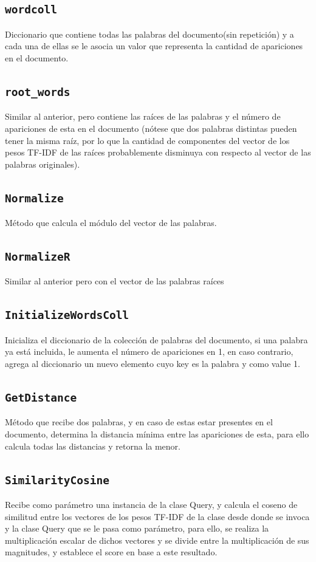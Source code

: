 \documentclass{report}
\newcommand{\csharpproperty}[1]{\textcolor{csharp-property}{\texttt{#1}}}
\begin{document}
\subsection{\csharpproperty{wordcoll}}
Diccionario que contiene todas las palabras del documento(sin repetición) y a cada una de ellas se le asocia un valor que representa la cantidad de apariciones en el documento.
\subsection{\csharpproperty{root\_{}words}}
Similar al anterior, pero contiene las raíces de las palabras y el número de apariciones de esta en el documento (nótese que dos palabras distintas pueden tener la misma raíz, por lo que la cantidad de componentes del vector de los pesos TF-IDF de las raíces probablemente disminuya con respecto al vector de las palabras originales).


\subsection{\csharpproperty{Normalize}}
Método que calcula el módulo del vector de las palabras.
\subsection{\csharpproperty{NormalizeR}}
Similar al anterior pero con el vector de las palabras raíces
\subsection{\csharpproperty{InitializeWordsColl}}
Inicializa el diccionario de la colección de palabras del documento, si una palabra ya está incluida, le aumenta el número de apariciones en 1, en caso contrario, agrega al diccionario un nuevo elemento cuyo key es la palabra y como value 1.
\subsection{\csharpproperty{GetDistance}}
Método que recibe dos palabras, y en caso de estas estar presentes en el documento, determina la distancia mínima entre las apariciones de esta, para ello calcula todas las distancias y retorna la menor.
\subsection{\csharpproperty{SimilarityCosine}}
Recibe como parámetro una instancia de la clase Query, y calcula el coseno de similitud entre los vectores de los pesos TF-IDF de la clase desde donde se invoca y la clase Query que se le pasa como parámetro, para ello, se realiza la multiplicación escalar de dichos vectores y se divide entre la multiplicación de sus magnitudes, y establece el score en base a este resultado.
\end{document}
